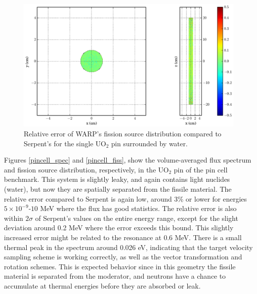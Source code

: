 \begin{figure}[h!]
\centering
\includegraphics[width=\textwidth,trim= 11cm 0cm 6cm 0cm]{graphics/finalresults/pincell_fiss_diff-6.eps}
\caption{Relative error of WARP's fission source distribution compared to Serpent's for the single UO$_2$ pin surrounded by water. \label{pincell_fiss_diff} }
\end{figure}

Figures \ref{pincell_spec} and \ref{pincell_fiss}, show the volume-averaged flux spectrum and fission source distribution, respectively, in the UO$_2$ pin of the pin cell benchmark.  This system is slightly leaky, and again contains light nuclides (water), but now they are spatially separated from the fissile material.  The relative error compared to Serpent is again low, around 3\% or lower for energies $5\times10^{-9}$-$10$ MeV where the flux has good statistics.  The relative error is also within $2\sigma$ of Serpent's values on the entire energy range, except for the slight deviation around 0.2 MeV where the error exceeds this bound.  This slightly increased error might be related to the resonance at 0.6 MeV.  There is a small thermal peak in the spectrum around 0.026 eV, indicating that the target velocity sampling scheme is working correctly, as well as the vector transformation and rotation schemes.  This is expected behavior since in this geometry the fissile material is separated from the moderator, and neutrons have a chance to accumulate at thermal energies before they are absorbed or leak.  

